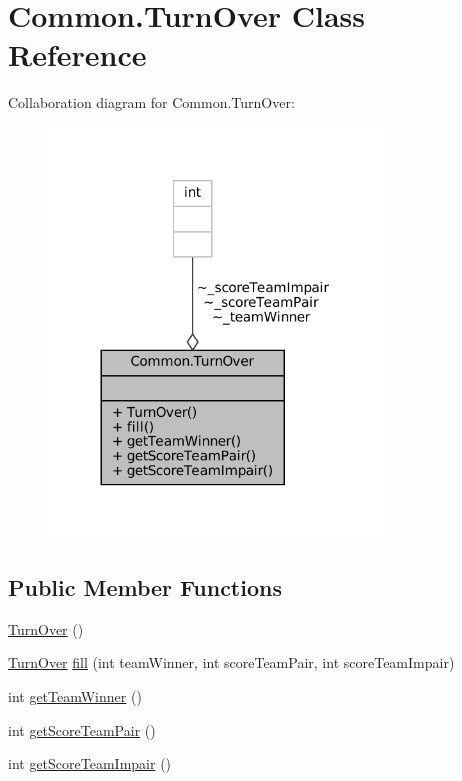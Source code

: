 \hypertarget{classCommon_1_1TurnOver}{}\section{Common.\+Turn\+Over Class Reference}
\label{classCommon_1_1TurnOver}


Collaboration diagram for Common.\+Turn\+Over\+:
\nopagebreak
\begin{figure}[H]
\begin{center}
\leavevmode
\includegraphics[width=252pt]{classCommon_1_1TurnOver__coll__graph}
\end{center}
\end{figure}
\subsection*{Public Member Functions}
\begin{DoxyCompactItemize}
\item 
\mbox{\hyperlink{classCommon_1_1TurnOver_ab363e9352d4d9c83078c60e139d215ff}{Turn\+Over}} ()
\item 
\mbox{\hyperlink{classCommon_1_1TurnOver}{Turn\+Over}} \mbox{\hyperlink{classCommon_1_1TurnOver_a91509cdb363a8c8332ba2ce485c1666b}{fill}} (int team\+Winner, int score\+Team\+Pair, int score\+Team\+Impair)
\item 
int \mbox{\hyperlink{classCommon_1_1TurnOver_a0c289567ad579b5d0c7dab7369eb669f}{get\+Team\+Winner}} ()
\item 
int \mbox{\hyperlink{classCommon_1_1TurnOver_aaebd9886a748957fb4e5180acf6916de}{get\+Score\+Team\+Pair}} ()
\item 
int \mbox{\hyperlink{classCommon_1_1TurnOver_ad953fcf6e0f08b09669753cc1529ff24}{get\+Score\+Team\+Impair}} ()
\end{DoxyCompactItemize}


